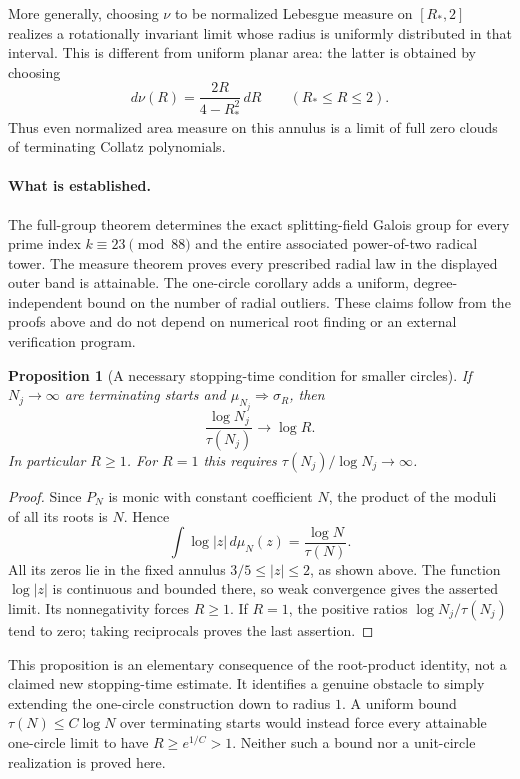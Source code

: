 \documentclass[11pt,a4paper]{article}
\newtheorem{proposition}[theorem]{Proposition}
\theoremstyle{definition}
\theoremstyle{remark}
\numberwithin{equation}{section}
\begin{document}
More generally, choosing $\nu$ to be normalized Lebesgue measure on
$[R_*,2]$ realizes a rotationally invariant limit whose radius is uniformly
distributed in that interval. This is different from uniform planar area:
the latter is obtained by choosing
\[
 d\nu(R)=\frac{2R}{4-R_*^2}\,dR\qquad(R_*\le R\le2).
\]
Thus even normalized area measure on this annulus is a limit of full zero
clouds of terminating Collatz polynomials.

\paragraph{What is established.}
The full-group theorem determines the exact splitting-field Galois group
for every prime index $k\equiv23\pmod {88}$ and the entire associated
power-of-two radical tower. The measure theorem proves every prescribed
radial law in the displayed outer band is attainable. The one-circle
corollary adds a uniform, degree-independent bound on the number of radial
outliers. These claims follow from the proofs above and do not depend on
numerical root finding or an external verification program.

\begin{proposition}[A necessary stopping-time condition for smaller circles]
\label{D:prop:stopping}
If $N_j\to\infty$ are terminating starts and $\mu_{N_j}\Longrightarrow\sigma_R$,
then
\[
 \frac{\log N_j}{\tau(N_j)}\longrightarrow\log R.
\]
In particular $R\ge1$. For $R=1$ this requires
$\tau(N_j)/\log N_j\to\infty$.
\end{proposition}
\begin{proof}
Since $P_N$ is monic with constant coefficient $N$, the product of the
moduli of all its roots is $N$. Hence
\[
 \int\log|z|\,d\mu_N(z)=\frac{\log N}{\tau(N)}.
\]
All its zeros lie in the fixed annulus $3/5\le|z|\le2$, as shown above.
The function $\log|z|$ is continuous and bounded there, so weak convergence
gives the asserted limit. Its nonnegativity forces $R\ge1$.
If $R=1$, the positive ratios $\log N_j/\tau(N_j)$ tend to zero;
taking reciprocals proves the last assertion.
\end{proof}

This proposition is an elementary consequence of the root-product identity,
not a claimed new stopping-time estimate. It identifies a genuine obstacle
to simply extending the one-circle construction down to radius $1$.
A uniform bound $\tau(N)\le C\log N$ over terminating starts would instead
force every attainable one-circle limit to have $R\ge e^{1/C}>1$.
Neither such a bound nor a unit-circle realization is proved here.
\end{document}

